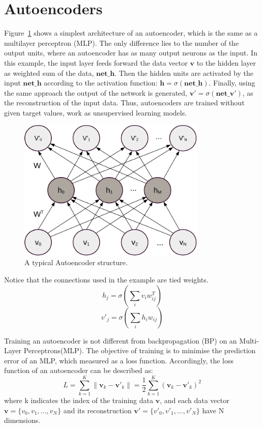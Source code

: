 \section{Autoencoders}
	Figure~\ref{fig:AE} shows a simplest architecture of an autoencoder, which is the same as a multilayer perceptron (MLP).
	The only difference lies to the number of the output units, where an autoencoder has as many output neurons as the input.
	In this example, the input layer feeds forward the data vector $\mathbf{v}$ to the hidden layer as weighted sum of the data, $\mathbf{net\_h}$.
	Then the hidden units are activated by the input $\mathbf{net\_h}$ according to the activation function: $\mathbf{h}=\sigma(\mathbf{net\_h})$.
	Finally, using the same approach the output of the network is generated, $\mathbf{v'}=\sigma(\mathbf{net\_v'})$, as the reconstruction of the input data.
	Thus, autoencoders are trained without given target values, work as unsupervised learning models.	
	\begin{figure}
		\centering
		\includegraphics[width=0.8\textwidth]{pics_sdbn/AE.pdf}
		\caption{A typical Autoencoder structure.}
		\label{fig:AE}
	\end{figure}
	
	Notice that the connections used in the example are tied weights.
	\begin{equation}
	h_j=\sigma(\sum_i v_i w^T_{ij})
	\end{equation}
	\begin{equation}
	v'_j=\sigma(\sum_i h_i w_{ij})
	\end{equation}
	
	Training an autoencoder is not different from backpropagation (BP) on an Multi-Layer Perceptrons(MLP).
	The objective of training is to minimise the prediction error of an MLP, which measured as a loss function.
	Accordingly, the loss function of an autoencoder can be described as:
	\begin{equation}
	L=\sum_{k=1}^{K}\|\mathbf{v}_{k}-\mathbf{v'}_{k}\|=\frac{1}{2}\sum_{k=1}^{K}(\mathbf{v}_{k}-\mathbf{v'}_{k})^{2}
	\end{equation}
	where k indicates the index of the training data $\mathbf{v}$, and each data vector $\mathbf{v}=\{v_0, v_1,...,v_N\}$ and its reconstruction $\mathbf{v'}=\{v'_0, v'_1,...,v'_N\}$ have N dimensions. 
	
